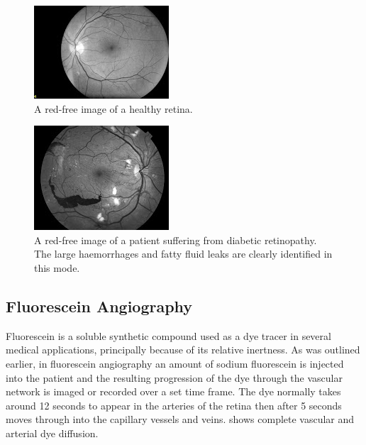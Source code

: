 \begin{figure}[H]
\centering
\includegraphics{figures/redfree}
\caption{A red-free image of a healthy retina.\cite{1_topconmedical.com_2015}}
\label{fig:red}
   \end{figure}

\begin{figure}[H]
\centering
\includegraphics{figures/redfreediabetic}
\caption{A red-free image of a patient suffering from diabetic retinopathy. The large haemorrhages and fatty fluid leaks are clearly identified in this mode.\cite{1_topconmedical.com_2015}}
\label{fig:reddr}
   \end{figure}



\subsection{Fluorescein Angiography}

Fluorescein is a soluble synthetic compound used as a dye tracer in
several medical applications, principally because of its relative inertness.
As was outlined earlier, in fluorescein angiography an amount of sodium
fluorescein is injected into the patient and the resulting progression of the
dye through the vascular network is imaged or recorded over a set time
frame. The dye normally takes around 12 seconds to appear in the arteries
of the retina then after 5 seconds moves through into the capillary vessels
and veins.  shows complete vascular and arterial dye diffusion.

